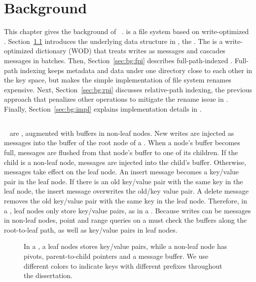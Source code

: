 \chapter{Background}
\label{chap:bg}

This chapter gives the background of \betrfs~\citep{betrfs1,betrfs1tos,betrfs2,betrfs2tos,betrfs3}.
\betrfs is a file system based on write-optimized \bets.
Section~\ref{sec:bg:bet} introduces the underlying data structure in \betrfs,
the \bet.
The \bet is a write-optimized dictionary (WOD)
that treats writes as messages and cascades messages in batches.
Then, Section~\ref{sec:bg:fpi} describes full-path-indexed \betrfs.
Full-path indexing keeps metadata and data under one directory close to each
other in the key space,
but makes the simple implementation of file system renames expensive.
Next, Section~\ref{sec:bg:rpi} discusses relative-path indexing,
the previous approach that penalizes other operations to mitigate the rename issue
in \betrfs.
Finally, Section~\ref{sec:bg:impl} explains implementation details
in \betrfs.

\section{\bets}
\label{sec:bg:bet}

\bets~\citep{bet,betlogin} are \btrees, augmented with buffers in non-leaf
nodes.
New writes are injected as messages into the buffer of the root node of a \bet.
When a node's buffer becomes full, messages are flushed from that node's buffer
to one of its children.
If the child is a non-leaf node, messages are injected into the child's
buffer.
Otherwise, messages take effect on the leaf node.
An insert message becomes a key/value pair in the leaf node.
If there is an old key/value pair with the same key in the leaf node,
the insert message overwrites the old/key value pair.
A delete message removes the old key/value pair with the same key in the leaf
node.
Therefore, in a \bet, leaf nodes only store key/value pairs, as in a \btree.
Because writes can be messages in non-leaf nodes, point and range queries on a
\bet must check the buffers along the root-to-leaf path,
as well as key/value pairs in leaf nodes.

\begin{figure}[t]
    \centering
    
    \caption[A \bet example]{\label{fig:bet}
        In a \bet, a leaf nodes stores key/value pairs, while a non-leaf node
        has pivots, parent-to-child pointers and a message buffer.
        We use different colors to indicate keys with different prefixes
        throughout the dissertation.}
\end{figure}

